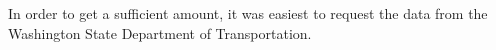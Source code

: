 \documentclass[11pt]{article} %
\begin{document}
In order to get a sufficient amount, it was
easiest to request the data from the Washington State Department of Transportation.
 

% 
% 
\end{document}
